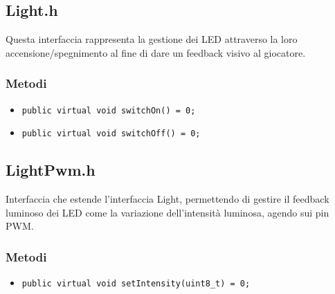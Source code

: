 \subsection{Light.h}
Questa interfaccia rappresenta la gestione dei LED attraverso la loro accensione/spegnimento al fine di dare un feedback visivo al giocatore.
\subsubsection{Metodi}
\begin{itemize}
	\item \texttt{public virtual void switchOn() = 0;}
	\item \texttt{public virtual void switchOff() = 0;}
\end{itemize}

\subsection{LightPwm.h}
Interfaccia che estende l'interfaccia Light, permettendo di gestire il feedback luminoso dei LED come la variazione dell'intensità luminosa, agendo sui pin PWM.
\subsubsection{Metodi}
\begin{itemize}
	\item \texttt{public virtual void setIntensity(uint8\_t) = 0;}
\end{itemize}

